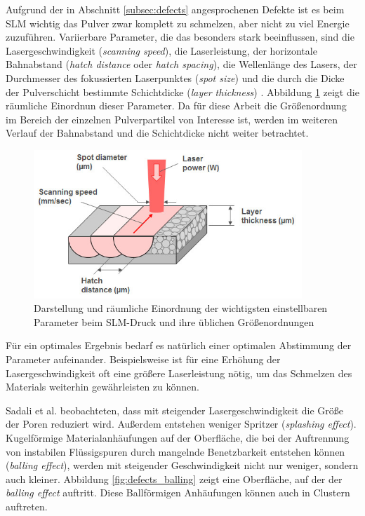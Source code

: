 		Aufgrund der in Abschnitt \ref{subsec:defects} angesprochenen Defekte ist es beim
		SLM wichtig das Pulver zwar komplett zu schmelzen, aber nicht zu viel Energie zuzuführen.
		Variierbare Parameter, die das besonders stark beeinflussen, sind die Lasergeschwindigkeit
		(\emph{scanning speed}), die Laserleistung, der horizontale Bahnabstand
		(\emph{hatch distance} oder \emph{hatch spacing}), die Wellenlänge des Lasers, der
		Durchmesser des fokussierten Laserpunktes (\emph{spot size}) und die durch die Dicke der
		Pulverschicht bestimmte  Schichtdicke (\emph{layer thickness}) \cite{sadali2020influence}.
		Abbildung \ref{fig:slm_parameters} zeigt die räumliche Einordnun dieser Parameter. Da für
		diese Arbeit die Größenordnung im Bereich der einzelnen Pulverpartikel von Interesse ist,
		werden im weiteren Verlauf der Bahnabstand und die Schichtdicke nicht weiter betrachtet.

		\begin{figure}[!ht]
			\centering
			\includegraphics[width=0.9\textwidth]{chapter/main/img/slm_parameters.jpg}
			\caption{Darstellung und räumliche Einordnung der wichtigsten einstellbaren Parameter
			beim SLM-Druck und ihre üblichen Größenordnungen \cite{saunders2017x}}
			\label{fig:slm_parameters}
		\end{figure}

		Für ein optimales Ergebnis bedarf es natürlich einer optimalen Abstimmung der Parameter
		aufeinander. Beispielsweise ist für eine Erhöhung der Lasergeschwindigkeit oft eine
		größere Laserleistung nötig, um das Schmelzen des Materials weiterhin gewährleisten
		zu können.

		Sadali et al. beobachteten, dass mit steigender Lasergeschwindigkeit die Größe der Poren
		reduziert wird. Außerdem entstehen weniger Spritzer (\emph{splashing effect}).
		Kugelförmige Materialanhäufungen auf der Oberfläche, die bei der Auftrennung von
		instabilen Flüssigspuren durch mangelnde Benetzbarkeit entstehen können
		(\emph{balling effect}), werden mit steigender Geschwindigkeit nicht nur weniger, sondern
		auch kleiner. Abbildung \ref{fig:defects_balling} zeigt eine Oberfläche, auf der der
		\emph{balling effect} auftritt. Diese Ballförmigen Anhäufungen können auch in Clustern
		auftreten.

